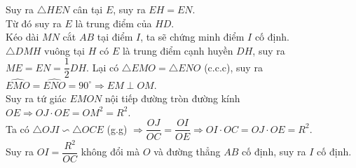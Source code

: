 \begin{bt}
{		Suy ra $\triangle HEN$ cân tại $E$, suy ra $EH=EN$.\\
		Từ đó suy ra $E$ là trung điểm của $HD$.\\
		Kéo dài $MN$ cắt $AB$ tại điểm $I$, ta sẽ chứng minh điểm $I$ cố định.\\
		$\triangle DMH$ vuông tại $H$ có $E$ là trung điểm cạnh huyền $DH$, suy ra $ME=EN=\dfrac{1}{2}DH$.
		Lại có $\triangle EMO=\triangle ENO$ (c.c.c), suy ra $\widehat {EMO}= \widehat{ENO}=90^\circ \Rightarrow EM \perp OM$.\\
		Suy ra tứ giác $EMON$ nội tiếp đường tròn đường kính $OE \Rightarrow OJ\cdot OE =OM^2 =R^2$.\\
		Ta có $\triangle OJI \backsim \triangle OCE$ (g.g) $\Rightarrow \dfrac{OJ}{OC}=\dfrac{OI}{OE} \Rightarrow OI \cdot OC = OJ \cdot OE = R^2$.\\ 
		Suy ra $OI = \dfrac{R^2}{OC}$ không đổi mà $O$ và đường thẳng $AB$ cố định, suy ra $I$ cố định.
	}	
\end{bt}

